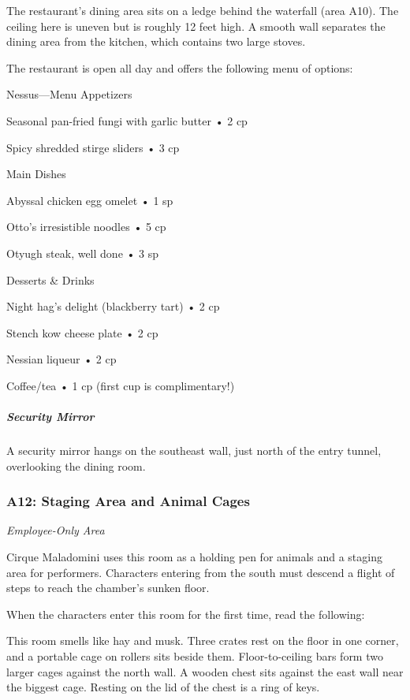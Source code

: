 \documentclass[10pt,a4paper,twoside,bg=print,twocolumn,openany,nodeprecatedcode]{dndbook}
\begin{document}
The restaurant's dining area sits on a ledge behind the waterfall (area A10). The ceiling here is uneven but is roughly 12 feet high. A smooth wall separates the dining area from the kitchen, which contains two large stoves.

The restaurant is open all day and offers the following menu of options:

\begin{DndReadAloud}{Nessus—Menu}
Appetizers

Seasonal pan-fried fungi with garlic butter • 2 cp

Spicy shredded stirge sliders • 3 cp

Main Dishes

Abyssal chicken egg omelet • 1 sp

Otto's irresistible noodles • 5 cp

Otyugh steak, well done • 3 sp

Desserts \& Drinks

Night hag's delight (blackberry tart) • 2 cp

Stench kow cheese plate • 2 cp

Nessian liqueur • 2 cp

Coffee/tea • 1 cp (first cup is complimentary!)

\end{DndReadAloud}

\subparagraph{Security Mirror}
A security mirror hangs on the southeast wall, just north of the entry tunnel, overlooking the dining room.

\subsubsection{A12: Staging Area and Animal Cages}
\textit{Employee-Only Area}

Cirque Maladomini uses this room as a holding pen for animals and a staging area for performers. Characters entering from the south must descend a flight of steps to reach the chamber's sunken floor.

When the characters enter this room for the first time, read the following:

\begin{DndReadAloud}{}
This room smells like hay and musk. Three crates rest on the floor in one corner, and a portable cage on rollers sits beside them. Floor-to-ceiling bars form two larger cages against the north wall. A wooden chest sits against the east wall near the biggest cage. Resting on the lid of the chest is a ring of keys.

\end{DndReadAloud}
\end{document}
